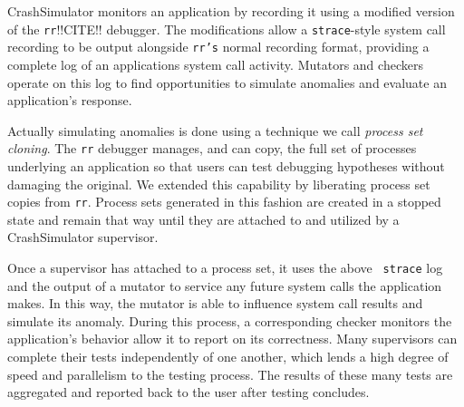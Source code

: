 CrashSimulator monitors an application by
recording it
using a modified version of the {\tt rr}!!CITE!!
debugger.
The modifications allow
a {\tt strace}-style
system call recording to be output alongside {\tt rr's} normal recording
format, providing
a complete log of an applications system call activity. Mutators and
checkers operate on this log to find opportunities to simulate
anomalies and evaluate an application's response.

Actually simulating anomalies
is done using
a technique
we call {\it process set cloning}.
The {\tt rr} debugger manages,
and can copy,
the full set of processes underlying an application
so that users can test debugging
hypotheses without damaging the original.
We extended this capability
by liberating process set copies from {\tt rr}.
Process sets generated in this fashion are created in a stopped state and
remain that way until they are attached to and utilized by a CrashSimulator
supervisor.

Once a supervisor has attached to a process set, it uses the above {\tt
strace} log and the output of a mutator to service any future
system calls the application makes.  In this way, the mutator is able to
influence system call results and simulate its anomaly.
During this process,
a corresponding checker
monitors the application's behavior allow it to report on its correctness.
Many supervisors can complete
their tests independently of one another, which lends a
high degree of speed and
parallelism to the testing process.  The results of
these many tests are aggregated and reported back to the user after testing
concludes.
